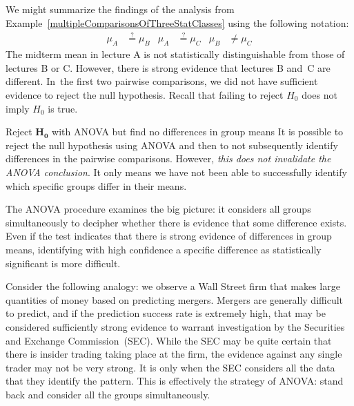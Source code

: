 \D{\newpage}

\noindent%
We might summarize the findings of the analysis from
Example~\ref{multipleComparisonsOfThreeStatClasses}
using the following notation:
\begin{align*}
\mu_A &\stackrel{?}{=} \mu_B
	&\mu_A &\stackrel{?}{=} \mu_C
	&\mu_B &\neq \mu_C
\end{align*}
The midterm mean in lecture A is not statistically
distinguishable from those of lectures B or C.
However, there is strong evidence that lectures B and~C
are different.
In~the first two pairwise comparisons, we did not have
sufficient evidence to reject the null hypothesis.
Recall that failing to reject $H_0$ does not imply $H_0$ is true.

\begin{onebox}{Reject $\pmb{H_0}$ with ANOVA
    but find no differences in group means}
  It is possible to reject the null hypothesis using ANOVA
  and then to not subsequently identify differences in the
  pairwise comparisons.
  However, \emph{this does not invalidate the ANOVA conclusion}.
  It only means we have not been able to successfully identify
  which specific groups differ in their means.
\end{onebox}

The ANOVA procedure examines the big picture:
it considers all groups simultaneously to decipher whether
there is evidence that some difference exists.
Even if the test indicates that there is strong evidence
of differences in group means, identifying with
high confidence a specific difference as statistically
significant is more difficult.

Consider the following analogy:
we observe a Wall Street firm that makes large quantities
of money based on predicting mergers.
Mergers are generally difficult to predict,
and if the prediction success rate is extremely high,
that may be considered sufficiently strong evidence
to warrant investigation by the Securities and Exchange
Commission~(SEC).
While the SEC may be quite certain that there is insider
trading taking place at the firm, the evidence against
any single trader may not be very strong.
It is only when the SEC considers all the data that they
identify the pattern.
This is effectively the strategy of ANOVA:
stand back and consider all the groups simultaneously.



{}
